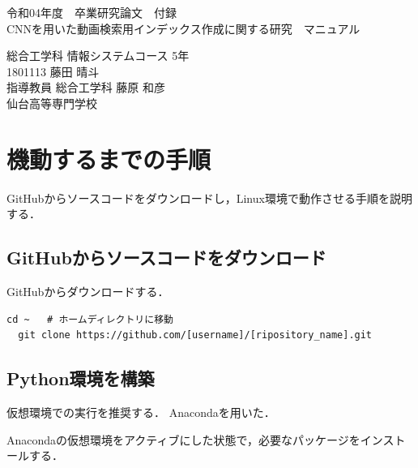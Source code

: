\documentclass[a4j,12pt,dvipdfmx]{jreport}
\begin{document}
\begin{titlepage} \centering
  \null \null
  \vspace{10mm}
  令和04年度　卒業研究論文　付録\\
  \vspace{55.15mm}
  \null
  {\Large CNNを用いた動画検索用インデックス作成に関する研究　マニュアル}\\
  
  \vspace{82.5mm}
  
  \large
  総合工学科 情報システムコース 5年\\[1mm]
  1801113 藤田 晴斗\\[1mm]
  指導教員 総合工学科 藤原 和彦\\
  
  \vspace{16mm}
  {仙台高等専門学校}
  \null

\end{titlepage}

\tableofcontents
\large
\renewcommand{\baselinestretch}{1.1}
\appendix
\chapter{機動するまでの手順}
GitHubからソースコードをダウンロードし，Linux環境で動作させる手順を説明する．

\section{GitHubからソースコードをダウンロード}
GitHubからダウンロードする．
\begin{lstlisting}[caption=Example,escapechar=|]
  cd ~   # ホームディレクトリに移動
  git clone https://github.com/[username]/[ripository_name].git
\end{lstlisting}

\section{Python環境を構築}
仮想環境での実行を推奨する．
Anacondaを用いた．

Anacondaの仮想環境をアクティブにした状態で，必要なパッケージをインストールする．
\begin{lstlisting}[caption=hoge,label=fuga]

\end{lstlisting}
\end{document}
